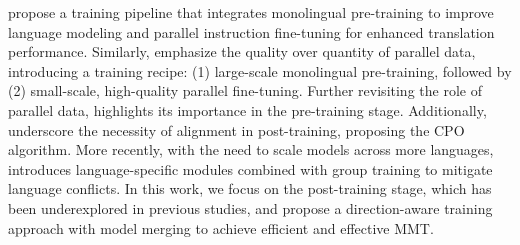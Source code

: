 \citet{yang2023bigtranslate} propose a training pipeline that integrates monolingual pre-training to improve language modeling and parallel instruction fine-tuning for enhanced translation performance. Similarly, \citet{xu2024a} emphasize the quality over quantity of parallel data, introducing a training recipe: (1) large-scale monolingual pre-training, followed by (2) small-scale, high-quality parallel fine-tuning. Further revisiting the role of parallel data, \citet{guo-etal-2024-novel} highlights its importance in the pre-training stage. Additionally, \citet{xu2024contrastive} underscore the necessity of alignment in post-training, proposing the CPO algorithm. More recently, with the need to scale models across more languages, \citet{xu2024x} introduces language-specific modules combined with group training to mitigate language conflicts. In this work, we focus on the post-training stage, which has been underexplored in previous studies, and propose a direction-aware training approach with model merging to achieve efficient and effective MMT.